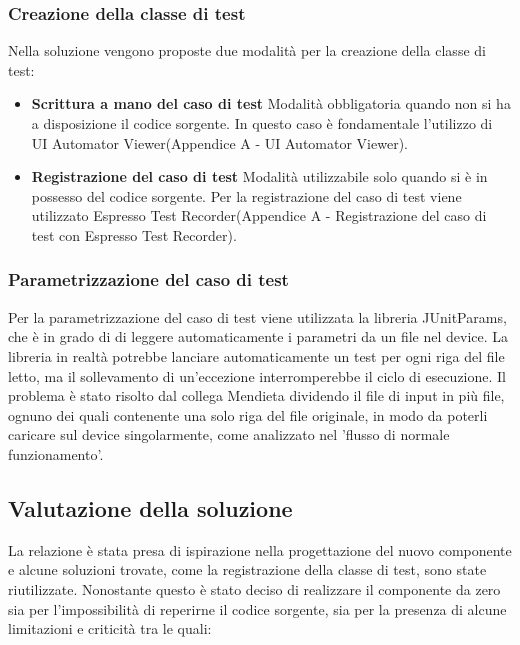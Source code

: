 \subsubsection{Creazione della classe di test}
Nella soluzione vengono proposte due modalità per la creazione della classe di test:
\begin{itemize} [nosep]
\item \textbf{Scrittura a mano del caso di test} \newline
Modalità obbligatoria quando non si ha a disposizione il codice sorgente. In questo caso è fondamentale l'utilizzo di UI Automator Viewer(Appendice A - UI Automator Viewer).
\item \textbf{Registrazione del caso di test} \newline
Modalità utilizzabile solo quando si è in possesso del codice sorgente. Per la registrazione del caso di test viene utilizzato Espresso Test Recorder(Appendice A - Registrazione del caso di test con Espresso Test Recorder).
\end{itemize}

\subsubsection{Parametrizzazione del caso di test}
Per la parametrizzazione del caso di test viene utilizzata la libreria JUnitParams, che è in grado di di leggere automaticamente i parametri da un file nel device. La libreria in realtà potrebbe lanciare automaticamente un test per ogni riga del file letto, ma il sollevamento di un'eccezione interromperebbe il ciclo di esecuzione. Il problema è stato risolto dal collega Mendieta dividendo il file di input in più file, ognuno dei quali contenente una solo riga del file originale,  in modo da poterli caricare sul device singolarmente, come analizzato nel 'flusso di normale funzionamento'.

\subsection{Valutazione della soluzione}
La relazione è stata presa di ispirazione nella progettazione del nuovo componente e alcune soluzioni trovate, come la registrazione della classe di test, sono state riutilizzate. Nonostante questo è stato deciso di realizzare il componente da zero sia per l'impossibilità di reperirne il codice sorgente, sia per la presenza di alcune limitazioni e criticità tra le quali: 

